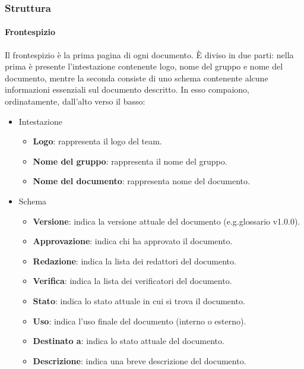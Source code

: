 \documentclass[../norme-di-progetto.tex]{subfiles}
\begin{document}
\subsubsection{Struttura}%
\label{subs:struttura}

\paragraph{Frontespizio}%
\label{par:frontespizio}
Il frontespizio è la prima pagina di ogni documento. È diviso in due parti: nella prima è presente l'intestazione contenente logo, nome del gruppo e nome del documento, mentre la seconda consiste di uno schema contenente alcune informazioni essenziali sul documento descritto. In esso compaiono, ordinatamente, dall'alto verso il basso:

\begin{itemize}
  \item Intestazione
        \begin{itemize}
          \item \textbf{Logo}: rappresenta il logo del team.
          \item \textbf{Nome del gruppo}: rappresenta il nome del gruppo.
          \item \textbf{Nome del documento}: rappresenta nome del documento.
        \end{itemize}
  \item Schema
        \begin{itemize}
          \item \textbf{Versione}: indica la versione attuale del documento (e.g.\@ glossario v1.0.0).
          \item \textbf{Approvazione}: indica chi ha approvato il documento.
          \item \textbf{Redazione}: indica la lista dei redattori del documento.
          \item \textbf{Verifica}: indica la lista dei verificatori del documento.
          \item \textbf{Stato}: indica lo stato attuale in cui si trova il documento.
          \item \textbf{Uso}: indica l'uso finale del documento (interno o esterno).
          \item \textbf{Destinato a}: indica lo stato attuale del documento.
          \item \textbf{Descrizione}: indica una breve descrizione del documento.
        \end{itemize}
\end{itemize}
\end{document}
